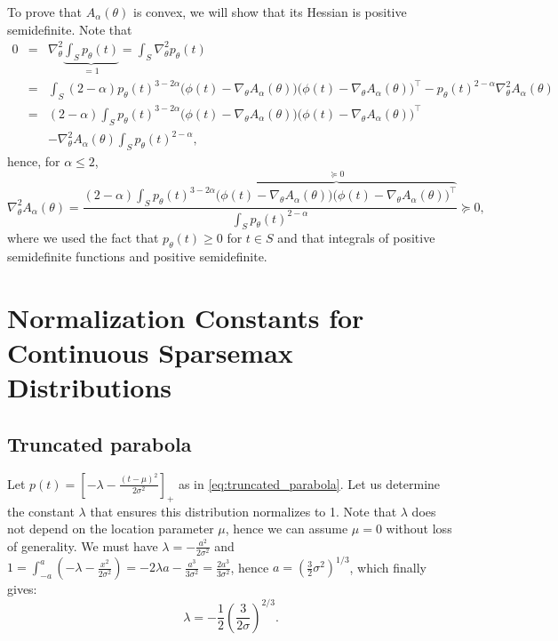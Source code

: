 \documentclass{article}
\begin{document}
To prove that $A_\alpha(\theta)$ is convex, we will show that its Hessian is positive semidefinite. Note that
\begin{eqnarray}
0 &=& \nabla^2_\theta \underbrace{\int_S  p_\theta(t)}_{=1} = \int_S \nabla^2_\theta p_\theta(t) \nonumber\\
&=& \int_S (2-\alpha)p_\theta(t)^{3-2\alpha}\bigl(\phi(t) - \nabla_\theta A_\alpha(\theta)\bigr) \bigl(\phi(t) - \nabla_\theta A_\alpha(\theta)\bigr)^\top  - p_\theta(t)^{2-\alpha} \nabla^2_\theta A_\alpha(\theta)\nonumber\\
&=& (2-\alpha) \int_S p_\theta(t)^{3-2\alpha}\bigl(\phi(t) - \nabla_\theta A_\alpha(\theta)\bigr) \bigl(\phi(t) - \nabla_\theta A_\alpha(\theta)\bigr)^\top  \nonumber\\
&& - \nabla^2_\theta A_\alpha(\theta) \int_S p_\theta(t)^{2-\alpha},
\end{eqnarray}
hence, for $\alpha \le 2$,
\begin{equation}
    \nabla^2_\theta A_\alpha(\theta) = \frac{(2-\alpha) \int_S p_\theta(t)^{3-2\alpha}\overbrace{\bigl(\phi(t) - \nabla_\theta A_\alpha(\theta)\bigr) \bigl(\phi(t) - \nabla_\theta A_\alpha(\theta)\bigr)^\top}^{\succeq 0}}{\int_S p_\theta(t)^{2-\alpha}} \succeq 0,
\end{equation}
where we used the fact that $p_\theta(t) \ge 0$ for $t \in S$ and that integrals of positive semidefinite functions and positive semidefinite.

\section{Normalization Constants for Continuous Sparsemax Distributions}\label{sec:normalization_constants}

\subsection{Truncated parabola}\label{sec:proof_truncated_parabola}

Let $p(t) = \left[-\lambda - \frac{(t-\mu)^2}{2\sigma^2}\right]_+$ as in \eqref{eq:truncated_parabola}.
Let us determine the constant $\lambda$ that ensures this distribution normalizes to 1. Note that $\lambda$ does not depend on the location parameter $\mu$, hence we can assume $\mu=0$ without loss of generality. We must have
$\lambda = -\frac{a^2}{2\sigma^2}$ and $1 = \int_{-a}^{a} \left(-\lambda - \frac{x^2}{2\sigma^2}\right) = -2\lambda a - \frac{a^3}{3\sigma^2} = \frac{2a^3}{3\sigma^2}$, hence
$a = \left(\frac{3}{2}\sigma^2\right)^{1/3}$, which finally gives:
\begin{equation}\label{eq:lambda_gaussian_proof}
\lambda = -\frac{1}{2}\left(\frac{3}{2\sigma}\right)^{2/3}.
\end{equation}
\end{document}
